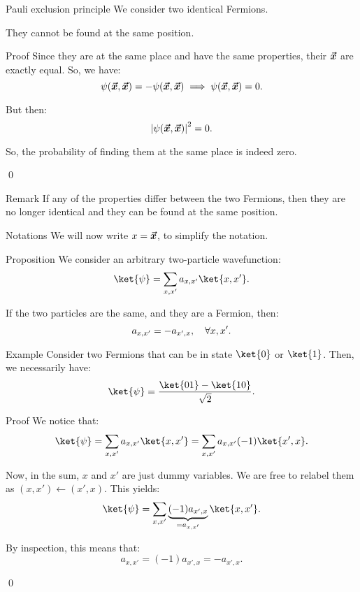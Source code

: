 \documentclass[a4paper]{article}
\begin{document}
\begin{parag}{Pauli exclusion principle}
    We consider two identical Fermions. 

    They cannot be found at the same position.

    \begin{subparag}{Proof}
        Since they are at the same place and have the same properties, their $\bm{\protect\vec{x}}$ are exactly equal. So, we have: 
        \[\psi\left(\bvec{x}, \bvec{x}\right) = -\psi\left(\bvec{x}, \bvec{x}\right) \implies \psi\left(\bvec{x}, \bvec{x}\right) = 0.\]

        But then: 
        \[\left|\psi\left(\bvec{x}, \bvec{x}\right)\right|^2 = 0.\]
        
        So, the probability of finding them at the same place is indeed zero. 

        \qed
    \end{subparag}

    \begin{subparag}{Remark}
        If any of the properties differ between the two Fermions, then they are no longer identical and they can be found at the same position.
    \end{subparag}
\end{parag}

\begin{parag}{Notations}
    We will now write $x = \bm{\protect\vec{x}}$, to simplify the notation.
\end{parag}

\begin{parag}{Proposition}
    We consider an arbitrary two-particle wavefunction: 
    \[\ket{\psi} = \sum_{x, x'} a_{x, x'} \ket{x, x'}.\]

    If the two particles are the same, and they are a Fermion, then: 
    \[a_{x, x'} = -a_{x', x}, \quad \forall x, x'.\]
    
    \begin{subparag}{Example}
        Consider two Fermions that can be in state $\ket{0}$ or $\ket{1}$. Then, we necessarily have: 
        \[\ket{\psi} = \frac{\ket{01} - \ket{10}}{\sqrt{2}}.\]
    \end{subparag}

    \begin{subparag}{Proof}
        We notice that:
        \[\ket{\psi} = \sum_{x, x'} a_{x, x'} \ket{x, x'} = \sum_{x, x'} a_{x, x'} \left(-1\right)\ket{x', x}.\]
        
        Now, in the sum, $x$ and $x'$ are just dummy variables. We are free to relabel them as $\left(x, x'\right) \leftarrow \left(x', x\right)$. This yields: 
        \[\ket{\psi} = \sum_{x, x'} \underbrace{\left(-1\right) a_{x', x}}_{= a_{x, x'}} \ket{x, x'}.\]
        
        By inspection, this means that: 
        \[a_{x, x'} = \left(-1\right) a_{x', x} = -a_{x', x}.\]

        \qed
    \end{subparag}
\end{parag}
\end{document}
